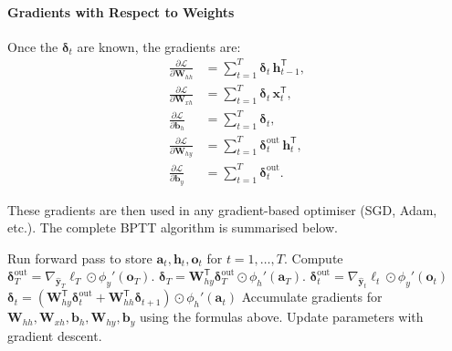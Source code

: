 \documentclass{tufte-handout}
\begin{document}
\paragraph{Gradients with Respect to Weights}
Once the $\boldsymbol{\delta}_t$ are known, the gradients are:
\begin{align}
    \frac{\partial \mathcal{L}}{\partial \mathbf{W}_{hh}} &= \sum_{t=1}^{T} \boldsymbol{\delta}_t \, \mathbf{h}_{t-1}^{\mathsf{T}}, \\
    \frac{\partial \mathcal{L}}{\partial \mathbf{W}_{xh}} &= \sum_{t=1}^{T} \boldsymbol{\delta}_t \, \mathbf{x}_t^{\mathsf{T}}, \\
    \frac{\partial \mathcal{L}}{\partial \mathbf{b}_h} &= \sum_{t=1}^{T} \boldsymbol{\delta}_t, \\
    \frac{\partial \mathcal{L}}{\partial \mathbf{W}_{hy}} &= \sum_{t=1}^{T} \boldsymbol{\delta}_t^{\text{out}} \, \mathbf{h}_t^{\mathsf{T}}, \\
    \frac{\partial \mathcal{L}}{\partial \mathbf{b}_y} &= \sum_{t=1}^{T} \boldsymbol{\delta}_t^{\text{out}}.
\end{align}

These gradients are then used in any gradient-based optimiser (SGD, Adam, etc.). The complete BPTT algorithm is summarised below.

\begin{algorithm}[h]
    \caption{Backpropagation Through Time (BPTT)}
    \begin{algorithmic}[1]
        \State Run forward pass to store $\mathbf{a}_t, \mathbf{h}_t, \mathbf{o}_t$ for $t=1,\dots,T$.
        \State Compute $\boldsymbol{\delta}_T^{\text{out}} = \nabla_{\hat{\mathbf{y}}_T}\ell_T \odot \phi_y'(\mathbf{o}_T)$.
        \State $\boldsymbol{\delta}_T = \mathbf{W}_{hy}^{\mathsf{T}} \boldsymbol{\delta}_T^{\text{out}} \odot \phi_h'(\mathbf{a}_T)$.
            \State $\boldsymbol{\delta}_t^{\text{out}} = \nabla_{\hat{\mathbf{y}}_t}\ell_t \odot \phi_y'(\mathbf{o}_t)$
            \State $\boldsymbol{\delta}_t = \left( \mathbf{W}_{hy}^{\mathsf{T}} \boldsymbol{\delta}_t^{\text{out}} + \mathbf{W}_{hh}^{\mathsf{T}} \boldsymbol{\delta}_{t+1} \right) \odot \phi_h'(\mathbf{a}_t)$
        \EndFor
        \State Accumulate gradients for $\mathbf{W}_{hh}, \mathbf{W}_{xh}, \mathbf{b}_h, \mathbf{W}_{hy}, \mathbf{b}_y$ using the formulas above.
        \State Update parameters with gradient descent.
    \end{algorithmic}
\end{algorithm}
\end{document}
